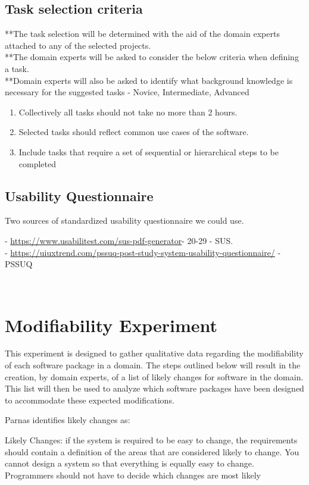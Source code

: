\documentclass[letterpaper,cleveref]{lipics-v2019}
\theoremstyle{definition}
\begin{document}
\subsection{Task selection criteria}
**The task selection will be determined with the aid of the domain experts attached to any of the selected projects.\\ 
**The domain experts will be asked to consider the below criteria when defining a task. \\
**Domain experts will also be asked to identify what background knowledge is necessary for the suggested tasks - Novice, Intermediate, Advanced
\begin {enumerate}
\item Collectively all tasks should not take no more than 2 hours.
\item Selected tasks should reflect common use cases of  the software.
\item Include tasks that require a set of sequential or hierarchical steps to be completed 

\end {enumerate} 


\subsection{Usability Questionnaire}
Two sources of standardized usability questionnaire we could use.

- \url{https://www.usabilitest.com/sus-pdf-generator}- 20-29 - SUS.\\
- \url{https://uiuxtrend.com/pssuq-post-study-system-usability-questionnaire/} - PSSUQ


~\newpage
\section{Modifiability Experiment}

This experiment is designed to gather qualitative data regarding the modifiability of each software package in a domain. The steps outlined below will result in the creation, by domain experts, of a list of likely changes for software in the domain. This list will then be used to analyze which software packages have been designed to accommodate these expected modifications. 

Parnas identifies likely changes as:

 Likely Changes: if the system is required to be easy to change, the requirements should  contain  a  definition  of  the  areas  that  are  considered  likely  to  change.  You  cannot design a system so that everything is equally easy to change. Programmers should not have to decide which changes are most likely\cite{parnas1986rational}
\end{document}
